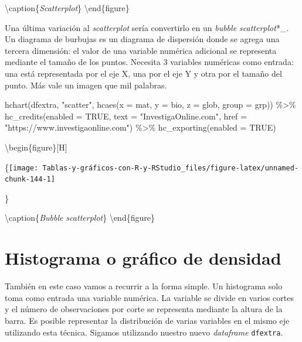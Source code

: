 \documentclass[
]{book}
\newenvironment{Shaded}{\begin{snugshade}}{\end{snugshade}}
\newcommand{\AttributeTok}[1]{\textcolor[rgb]{0.77,0.63,0.00}{#1}}
\newcommand{\ConstantTok}[1]{\textcolor[rgb]{0.00,0.00,0.00}{#1}}
\newcommand{\FunctionTok}[1]{\textcolor[rgb]{0.00,0.00,0.00}{#1}}
\newcommand{\NormalTok}[1]{#1}
\newcommand{\SpecialCharTok}[1]{\textcolor[rgb]{0.00,0.00,0.00}{#1}}
\newcommand{\StringTok}[1]{\textcolor[rgb]{0.31,0.60,0.02}{#1}}
\begin{document}
\textbackslash caption\{\emph{Scatterplot}\}\label{fig:unnamed-chunk-143}
\textbackslash end\{figure\}

Una última variación al \emph{scatterplot} sería convertirlo en un \emph{bubble scatterplot}*\_. Un diagrama de burbujas es un diagrama de dispersión donde se agrega una tercera dimensión: el valor de una variable numérica adicional se representa mediante el tamaño de los puntos. Necesita 3 variables numéricas como entrada: una está representada por el eje X, una por el eje Y y otra por el tamaño del punto. Más vale un imagen que mil palabras.

\begin{Shaded}
\begin{Highlighting}[]
\FunctionTok{hchart}\NormalTok{(dfextra, }\StringTok{"scatter"}\NormalTok{, }\FunctionTok{hcaes}\NormalTok{(}\AttributeTok{x =}\NormalTok{ mat, }\AttributeTok{y =}\NormalTok{ bio, }\AttributeTok{z =}\NormalTok{ glob, }
  \AttributeTok{group =}\NormalTok{ grp)) }\SpecialCharTok{\%\textgreater{}\%} \FunctionTok{hc\_credits}\NormalTok{(}\AttributeTok{enabled =} \ConstantTok{TRUE}\NormalTok{, }\AttributeTok{text =} \StringTok{"InvestigaOnline.com"}\NormalTok{, }
  \AttributeTok{href =} \StringTok{"https://www.investigaonline.com"}\NormalTok{) }\SpecialCharTok{\%\textgreater{}\%} \FunctionTok{hc\_exporting}\NormalTok{(}\AttributeTok{enabled =} \ConstantTok{TRUE}\NormalTok{)}
\end{Highlighting}
\end{Shaded}

\textbackslash begin\{figure\}{[}H{]}

\{\centering \texttt{[image: Tablas-y-gráficos-con-R-y-RStudio\_files/figure-latex/unnamed-chunk-144-1]}

\}

\textbackslash caption\{\emph{Bubble scatterplot}\}\label{fig:unnamed-chunk-144}
\textbackslash end\{figure\}

\hypertarget{histograma-o-gruxe1fico-de-densidad}{%
\section{Histograma o gráfico de densidad}\label{histograma-o-gruxe1fico-de-densidad}}

También en este caso vamos a recurrir a la forma simple. Un histograma solo toma como entrada una variable numérica. La variable se divide en varios cortes y el número de observaciones por corte se representa mediante la altura de la barra. Es posible representar la distribución de varias variables en el mismo eje utilizando esta técnica. Sigamos utilizando nuestro nuevo \emph{dataframe} \texttt{dfextra}.
\end{document}

